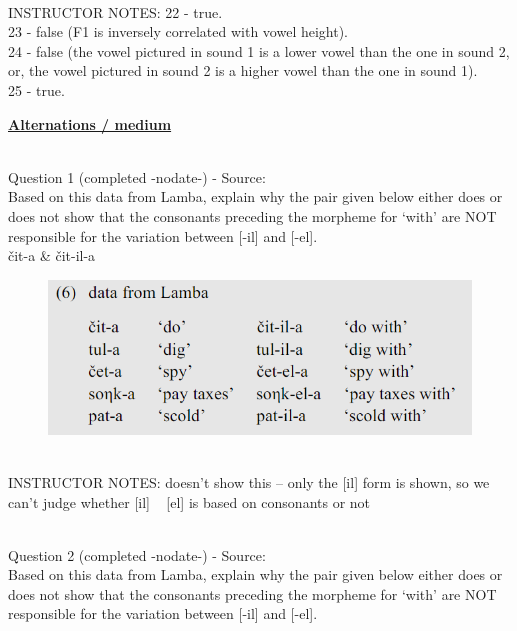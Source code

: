 \documentclass[12pt]{article}
\begin{document}
~\\
INSTRUCTOR NOTES: 22 - true. \\23 - false (F1 is inversely correlated with vowel height). \\24 - false (the vowel pictured in sound 1 is a lower vowel than the one in sound 2, or, the vowel pictured in sound 2 is a higher vowel than the one in sound 1).\\25 - true.


\newpage\textbf{\underline{\huge Alternations / medium\\}}

~\\

{\large Question 1} (completed -nodate-) - Source: \\

Based on this data from Lamba, explain why the pair given below either does or does not show that the consonants preceding the morpheme for `with' are NOT responsible for the variation between [-il] and [-el].\\

čit-a \& čit-il-a

\begin{figure}[H]
\includegraphics{../images/peng119_lamba.png}
\end{figure}

~\\
INSTRUCTOR NOTES: doesn't show this -- only the [il] form is shown, so we can't judge whether [il] ~ [el] is based on consonants or not


~\\

{\large Question 2} (completed -nodate-) - Source: \\

Based on this data from Lamba, explain why the pair given below either does or does not show that the consonants preceding the morpheme for `with' are NOT responsible for the variation between [-il] and [-el].\\
\end{document}
